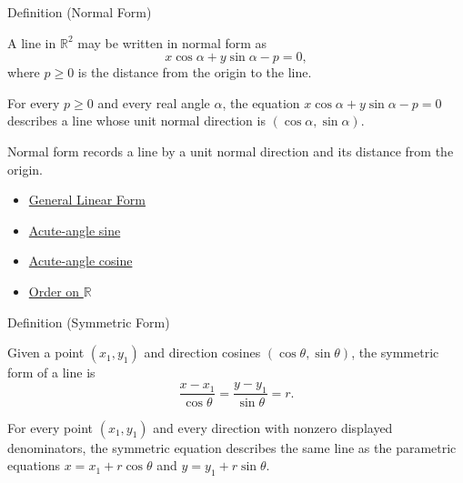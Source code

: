 \begin{definitionbox}{Definition (Normal Form)}
\begin{definition}\label{def:normal-form-line}
A line in $\mathbb{R}^2$ may be written in normal form as
\[
  x\cos\alpha+y\sin\alpha-p=0,
\]
where $p\ge 0$ is the distance from the origin to the line.
\end{definition}
\end{definitionbox}

\begin{remark*}
For every $p\ge 0$ and every real angle $\alpha$, the equation
$x\cos\alpha+y\sin\alpha-p=0$ describes a line whose unit normal direction is
$(\cos\alpha,\sin\alpha)$.
\end{remark*}

\begin{remark*}[Interpretation]
Normal form records a line by a unit normal direction and its distance from
the origin.
\end{remark*}

\begin{dependencies}
\begin{itemize}
  \item \hyperref[def:general-linear-form]{General Linear Form}
  \item \hyperref[def:acute-angle-sine]{Acute-angle sine}
  \item \hyperref[def:acute-angle-cosine]{Acute-angle cosine}
  \item \hyperref[def:order-on-r]{Order on $\mathbb{R}$}
\end{itemize}
\end{dependencies}

\begin{definitionbox}{Definition (Symmetric Form)}
\begin{definition}\label{def:symmetric-form-line}
Given a point $(x_1,y_1)$ and direction cosines
$(\cos\theta,\sin\theta)$, the symmetric form of a line is
\[
  \frac{x-x_1}{\cos\theta}
  =
  \frac{y-y_1}{\sin\theta}
  =
  r.
\]
\end{definition}
\end{definitionbox}

\begin{remark*}
For every point $(x_1,y_1)$ and every direction with nonzero displayed
denominators, the symmetric equation describes the same line as the
parametric equations $x=x_1+r\cos\theta$ and $y=y_1+r\sin\theta$.
\end{remark*}

